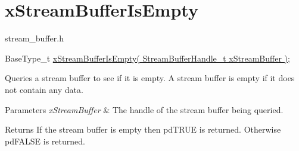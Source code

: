 \hypertarget{group__xStreamBufferIsEmpty}{}\section{x\+Stream\+Buffer\+Is\+Empty}
\label{group__xStreamBufferIsEmpty}
stream\+\_\+buffer.\+h


\begin{DoxyPre}
BaseType\_t \hyperlink{stream__buffer_8h_af65cd558025ddc29ca68fba1b3f5dc19}{xStreamBufferIsEmpty( StreamBufferHandle\_t xStreamBuffer )};
\end{DoxyPre}


Queries a stream buffer to see if it is empty. A stream buffer is empty if it does not contain any data.


\begin{DoxyParams}{Parameters}
{\em x\+Stream\+Buffer} & The handle of the stream buffer being queried.\\
\hline
\end{DoxyParams}
\begin{DoxyReturn}{Returns}
If the stream buffer is empty then pd\+T\+R\+UE is returned. Otherwise pd\+F\+A\+L\+SE is returned. 
\end{DoxyReturn}
